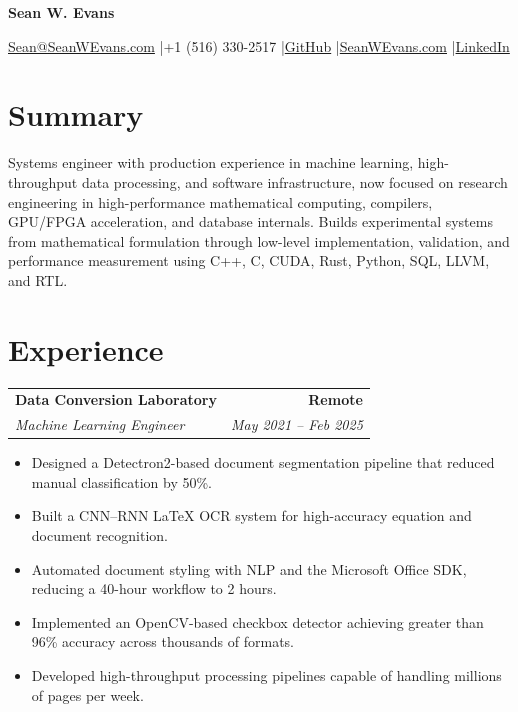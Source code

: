 \documentclass[10pt,letterpaper]{article}
\makeatletter
\newcommand{\job}[4]{%
    \begin{tabularx}{\linewidth}{@{}X r@{}}
        \textbf{#1} & \textbf{#2} \\
        \textit{#3} & \textit{#4}
    \end{tabularx}
    \vspace{-2pt}
}
\makeatother
\begin{document}
{\LARGE\bfseries Sean W. Evans}

\begin{center}
\href{mailto:Sean@SeanWEvans.com}{Sean@SeanWEvans.com}
\quad|\quad +1 (516) 330-2517
\quad|\quad \href{https://github.com/seanwevans}{GitHub}
\quad|\quad \href{https://seanwevans.com}{SeanWEvans.com}
\quad|\quad \href{https://www.linkedin.com/in/sean-evans-49398229b/}{LinkedIn}
\end{center}

\section*{Summary}

Systems engineer with production experience in machine learning,
high-throughput data processing, and software infrastructure, now focused on
research engineering in high-performance mathematical computing, compilers,
GPU/FPGA acceleration, and database internals. Builds experimental systems from
mathematical formulation through low-level implementation, validation, and
performance measurement using C++, C, CUDA, Rust, Python, SQL, LLVM, and RTL.

\section*{Experience}

\job
  {Data Conversion Laboratory}
  {Remote}
  {Machine Learning Engineer}
  {May 2021 -- Feb 2025}

\begin{itemize}
    \item Designed a Detectron2-based document segmentation pipeline that reduced
          manual classification by 50\%.
    \item Built a CNN--RNN LaTeX OCR system for high-accuracy equation and
          document recognition.
    \item Automated document styling with NLP and the Microsoft Office SDK,
          reducing a 40-hour workflow to 2 hours.
    \item Implemented an OpenCV-based checkbox detector achieving greater than
          96\% accuracy across thousands of formats.
    \item Developed high-throughput processing pipelines capable of handling
          millions of pages per week.
\end{itemize}

\vspace{1pt}
\end{document}
